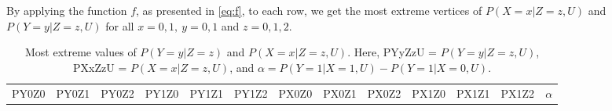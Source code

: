 \documentclass[
]{article}
\theoremstyle{plain}
\begin{document}
{By applying the function \(f\), as presented in \eqref{eq:f}, to each row, we get the most extreme vertices of \(P(X = x | Z = z, U)\) and \(P(Y = y | Z = z, U)\) for all \(x=0,1,\ y=0,1\) and \(z=0,1,2\).

\begin{longtable}[]{@{}ccccccccccccc@{}}
\caption{Most extreme values of \(P(Y = y | Z = z)\) and \(P(X = x | Z = z, U)\). Here, PYyZzU = \(P(Y = y | Z = z, U)\), PXxZzU = \(P(X = x | Z = z, U)\), and \(\alpha = P(Y = 1 | X = 1,U) - P(Y = 1 | X = 0,U)\).}\tabularnewline
\toprule
\begin{minipage}[b]{0.05\columnwidth}\centering
PY0Z0\strut
\end{minipage} & \begin{minipage}[b]{0.05\columnwidth}\centering
PY0Z1\strut
\end{minipage} & \begin{minipage}[b]{0.05\columnwidth}\centering
PY0Z2\strut
\end{minipage} & \begin{minipage}[b]{0.05\columnwidth}\centering
PY1Z0\strut
\end{minipage} & \begin{minipage}[b]{0.05\columnwidth}\centering
PY1Z1\strut
\end{minipage} & \begin{minipage}[b]{0.05\columnwidth}\centering
PY1Z2\strut
\end{minipage} & \begin{minipage}[b]{0.05\columnwidth}\centering
PX0Z0\strut
\end{minipage} & \begin{minipage}[b]{0.05\columnwidth}\centering
PX0Z1\strut
\end{minipage} & \begin{minipage}[b]{0.05\columnwidth}\centering
PX0Z2\strut
\end{minipage} & \begin{minipage}[b]{0.05\columnwidth}\centering
PX1Z0\strut
\end{minipage} & \begin{minipage}[b]{0.05\columnwidth}\centering
PX1Z1\strut
\end{minipage} & \begin{minipage}[b]{0.05\columnwidth}\centering
PX1Z2\strut
\end{minipage} & \begin{minipage}[b]{0.07\columnwidth}\centering
\(\alpha\)\strut
\end{minipage}\tabularnewline

\end{longtable}}
\end{document}
